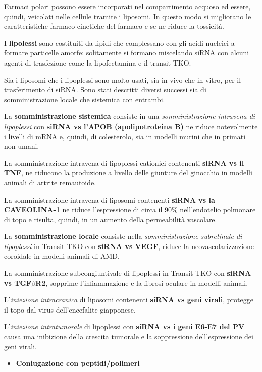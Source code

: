 \documentclass[]{article}
\begin{document}
Farmaci polari possono essere incorporati nel compartimento acquoso ed
essere, quindi, veicolati nelle cellule tramite i liposomi. In questo
modo si migliorano le caratteristiche farmaco-cinetiche del farmaco e se
ne riduce la tossicità.

I \textbf{lipolessi} sono costituiti da lipidi che complessano con gli
acidi nucleici a formare particelle amorfe: solitamente si formano
miscelando siRNA con alcuni agenti di trasfezione come la lipofectamina
e il transit-TKO.

Sia i liposomi che i lipoplessi sono molto usati, sia in vivo che in
vitro, per il trasferimento di siRNA. Sono stati descritti diversi
successi sia di somministrazione locale che sistemica con entrambi.

La \textbf{somministrazione sistemica} consiste in una
\emph{somministrazione intravena di lipoplessi} con \textbf{siRNA vs
l'APOB (apolipotroteina B)} ne riduce notevolmente i livelli di mRNA e,
quindi, di colesterolo, sia in modelli murini che in primati non umani.

La somministrazione intravena di lipoplessi cationici contenenti
\textbf{siRNA vs il TNF}, ne riducono la produzione a livello delle
giunture del ginocchio in modelli animali di artrite remautoide.

La somministrazione intravena di liposomi contenenti \textbf{siRNA vs la
CAVEOLINA-1} ne riduce l'espressione di circa il 90\% nell'endotelio
polmonare di topo e risulta, quindi, in un aumento della permeabilità
vascolare.

La \textbf{somministrazione locale} consiste nella
\emph{somministrazione subretinale di lipoplessi} in Transit-TKO con
\textbf{siRNA vs VEGF}, riduce la neovascolarizzazione coroidale in
modelli animali di AMD.

La somministrazione subcongiuntivale di lipoplessi in Transit-TKO con
\textbf{siRNA vs TGF\(\beta\)R2}, sopprime l'infiammazione e la fibrosi
oculare in modelli animali.

L'\emph{iniezione intracranica} di liposomi contenenti \textbf{siRNA vs
geni virali}, protegge il topo dal virus dell'encefalite giapponese.

L'\emph{iniezione intratumorale} di lipoplessi con \textbf{siRNA vs i
geni E6-E7 del PV} causa una inibizione della crescita tumorale e la
soppressione dell'espressione dei geni virali.

\begin{itemize}
\itemsep1pt\parskip0pt
\item
  \textbf{Coniugazione con peptidi/polimeri}
\end{itemize}
\end{document}
